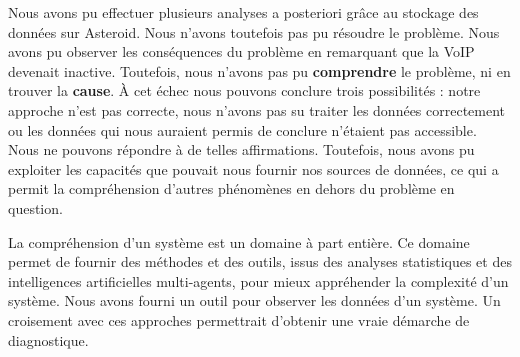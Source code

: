 Nous avons pu effectuer plusieurs analyses a posteriori grâce au stockage des données sur Asteroid. Nous n'avons toutefois pas pu résoudre le problème. Nous avons pu observer les conséquences du problème en remarquant que la VoIP devenait inactive. Toutefois, nous n'avons pas pu \textbf{comprendre} le problème, ni en trouver la \textbf{cause}. À cet échec nous pouvons conclure trois possibilités : notre approche n'est pas correcte, nous n'avons pas su traiter les données correctement ou les données qui nous auraient permis de conclure n'étaient pas accessible. Nous ne pouvons répondre à de telles affirmations. Toutefois, nous avons pu exploiter les capacités que pouvait nous fournir nos sources de données, ce qui a permit la compréhension d'autres phénomènes en dehors du problème en question.

La compréhension d'un système est un domaine à part entière. Ce domaine permet de fournir des méthodes et des outils, issus des analyses statistiques et des intelligences artificielles multi-agents, pour mieux appréhender la complexité d'un système. Nous avons fourni un outil pour observer les données d'un système. Un croisement avec ces approches permettrait d'obtenir une vraie démarche de diagnostique.
